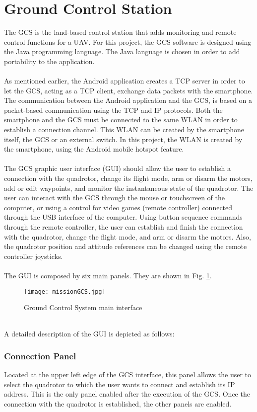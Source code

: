 \section{Ground Control Station}\label{sec:gcs}
The GCS is the land-based control station that adds monitoring and remote control functions for a UAV. For this project, the GCS software is designed using the Java programming language. The Java language is chosen in order to add portability to the application.
\\\\
As mentioned earlier, the Android application creates a TCP server in order to let the GCS, acting as a TCP client, exchange data packets with the smartphone. The communication between the Android application and the GCS, is based on a packet-based communication using the TCP and IP protocols. Both the smartphone and the GCS must be connected to the same WLAN in order to establish a connection channel. This WLAN can be created by the smartphone itself, the GCS or an external switch. In this project, the WLAN is created by the smartphone, using the Android mobile hotspot feature.
\\\\
The GCS graphic user interface (GUI) should allow the user to establish a connection with the quadrotor, change its flight mode, arm or disarm the motors, add or edit waypoints, and monitor the instantaneous state of the quadrotor. The user can interact with the GCS through the mouse or touchscreen of the computer, or using a control for video games (remote controller) connected through the USB interface of the computer. Using button sequence commands through the remote controller, the user can establish and finish the connection with the quadrotor, change the flight mode, and arm or disarm the motors. Also, the quadrotor position and attitude references can be changed using the remote controller joysticks.
\\\\
The GUI is composed by six main panels. They are shown in Fig. \ref{fig:missionGCS}. 
\begin{figure}[h]
\begin{center}
\texttt{[image: missionGCS.jpg]}  
\caption{Ground Control System main interface} 
\label{fig:missionGCS}
\end{center}
\end{figure}
\\A detailed description of the GUI is depicted as follows:
\subsubsection*{Connection Panel}
Located at the upper left edge of the GCS interface, this panel allows the user to select the quadrotor to which the user wants to connect and establish its IP address. This is the only panel enabled after the execution of the GCS. Once the connection with the quadrotor is established, the other panels are enabled.

